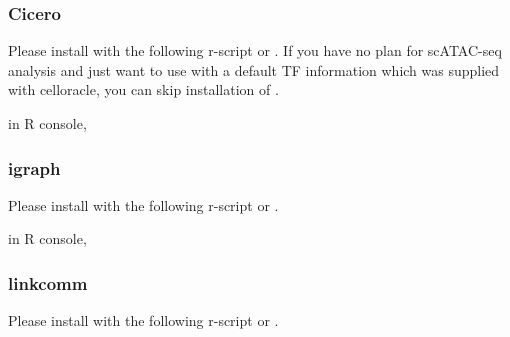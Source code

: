 \documentclass[letterpaper,10pt,english]{sphinxmanual}
\begin{document}
\subsubsection{Cicero}
\label{\detokenize{installation/index:id5}}
Please install  with the following r-script or  .
If you have no plan for scATAC-seq analysis and just want to use   with a default TF information which was supplied with celloracle, you can skip installation of .

in R console,

%
\begin{sphinxVerbatim}[commandchars=\\\{\}]
   
   
\end{sphinxVerbatim}


\subsubsection{igraph}
\label{\detokenize{installation/index:id7}}
Please install  with the following r-script or  .

in R console,

%
\begin{sphinxVerbatim}[commandchars=\\\{\}]
\end{sphinxVerbatim}


\subsubsection{linkcomm}
\label{\detokenize{installation/index:id9}}
Please install  with the following r-script or  .
\end{document}

